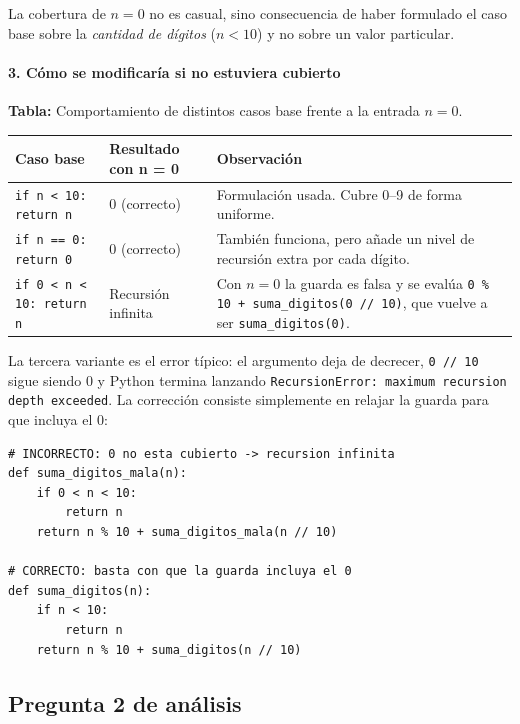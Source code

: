 \documentclass[12pt,a4paper]{article}
\begin{document}
La cobertura de $n = 0$ no es casual, sino consecuencia de haber formulado el caso base sobre
la \textit{cantidad de dígitos} ($n < 10$) y no sobre un valor particular.

\paragraph{3. Cómo se modificaría si no estuviera cubierto}\mbox{}

\begin{center}
\textbf{Tabla:} Comportamiento de distintos casos base frente a la entrada $n = 0$.

\vspace{4pt}
\begin{tabularx}{\textwidth}{|p{4.2cm}|p{3.0cm}|X|}
\hline
\textbf{Caso base} & \textbf{Resultado con n = 0} & \textbf{Observación} \\
\hline
\texttt{if n < 10: return n} & 0 (correcto) & Formulación usada. Cubre 0--9 de forma uniforme. \\
\hline
\texttt{if n == 0: return 0} & 0 (correcto) & También funciona, pero añade un nivel de recursión extra por cada dígito. \\
\hline
\texttt{if 0 < n < 10: return n} & Recursión infinita & Con $n = 0$ la guarda es falsa y se evalúa \texttt{0 \% 10 + suma\_digitos(0 // 10)}, que vuelve a ser \texttt{suma\_digitos(0)}. \\
\hline
\end{tabularx}
\end{center}

\vspace{6pt}
La tercera variante es el error típico: el argumento deja de decrecer, \texttt{0 // 10} sigue
siendo 0 y Python termina lanzando \texttt{RecursionError: maximum recursion depth exceeded}.
La corrección consiste simplemente en relajar la guarda para que incluya el 0:

\begin{lstlisting}[style=python,caption={Corrección del caso base defectuoso.}]
# INCORRECTO: 0 no esta cubierto -> recursion infinita
def suma_digitos_mala(n):
    if 0 < n < 10:
        return n
    return n % 10 + suma_digitos_mala(n // 10)

# CORRECTO: basta con que la guarda incluya el 0
def suma_digitos(n):
    if n < 10:
        return n
    return n % 10 + suma_digitos(n // 10)
\end{lstlisting}

\subsection*{Pregunta 2 de análisis}
\end{document}
